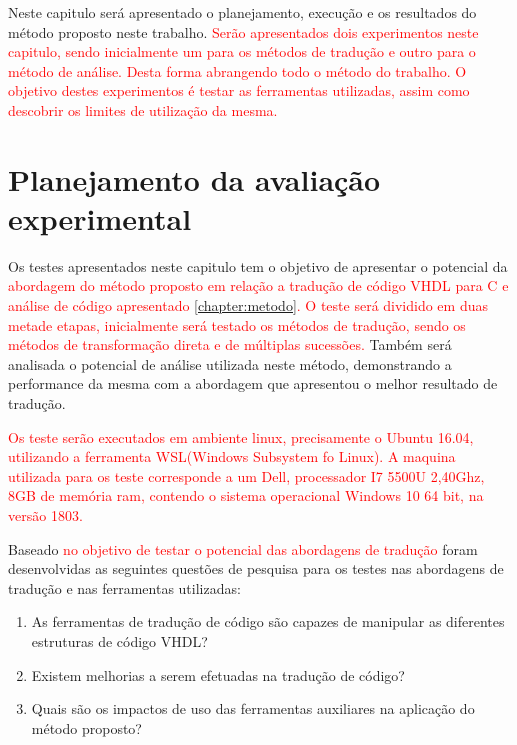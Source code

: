 \label{chapter:resultados}
\par
Neste capitulo será apresentado o planejamento, execução e os resultados do método proposto neste trabalho. \textcolor{red}{Serão apresentados dois experimentos neste capitulo, sendo inicialmente um para os métodos de tradução e outro para o método de análise. Desta forma abrangendo todo o método do trabalho. O objetivo destes experimentos é testar as ferramentas utilizadas, assim como descobrir os limites de utilização da mesma.}

\section{Planejamento da avaliação experimental}

\par 
Os testes apresentados neste capitulo tem o objetivo de apresentar o potencial da \textcolor{red}{abordagem do método proposto em relação a tradução de código VHDL para C e análise de código apresentado \autoref{chapter:metodo}. O teste será dividido em duas metade etapas, inicialmente será testado os métodos de tradução, sendo os métodos de transformação direta e de múltiplas sucessões.} Também será analisada o potencial de análise utilizada neste método, demonstrando a performance da mesma com a abordagem que apresentou o melhor resultado de tradução. 

\textcolor{red}{Os teste serão executados em ambiente linux, precisamente o Ubuntu 16.04, utilizando a ferramenta WSL(Windows Subsystem fo Linux). A maquina utilizada para os teste corresponde a um Dell, processador I7 5500U 2,40Ghz, 8GB de memória ram, contendo o sistema operacional Windows 10 64 bit, na versão 1803.}


\par 
Baseado \textcolor{red}{no objetivo de testar o potencial das abordagens de tradução} foram desenvolvidas as seguintes questões de pesquisa para os testes nas abordagens de tradução e nas ferramentas utilizadas: 
\begin{enumerate} 
    \item As ferramentas de tradução de código são capazes de manipular as diferentes estruturas de código VHDL? 
    \item Existem melhorias a serem efetuadas na tradução de código?
    \item Quais são os impactos de uso das ferramentas auxiliares na aplicação do método proposto? 
\end{enumerate} 

